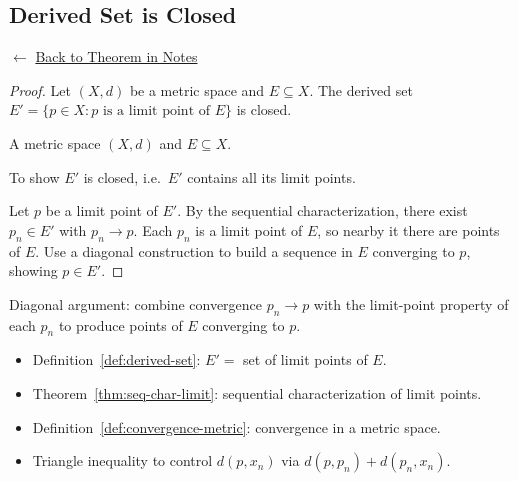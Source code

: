 
\subsection*{Derived Set is Closed}
\label{prf:derived-closed}

\begin{remark*}[Return]
$\leftarrow$ \hyperref[thm:derived-closed]{Back to Theorem in Notes}
\end{remark*}

\begin{proof}
\Claim Let $(X,d)$ be a metric space and $E \subseteq X$.
The derived set $E' = \{p \in X : p \text{ is a limit point of } E\}$
is closed.

\Given A metric space $(X,d)$ and $E \subseteq X$.

\Goal To show $E'$ is closed, i.e.\ $E'$ contains all its limit points.

\Strategy Let $p$ be a limit point of $E'$.
By the sequential characterization, there exist $p_n \in E'$ with $p_n \to p$.
Each $p_n$ is a limit point of $E$, so nearby it there are points of $E$.
Use a diagonal construction to build a sequence in $E$ converging to $p$,
showing $p \in E'$.


\end{proof}

\begin{remark*}
Diagonal argument: combine convergence $p_n \to p$ with the limit-point
property of each $p_n$ to produce points of $E$ converging to $p$.
\end{remark*}

\begin{remark*}[Dependencies]
\begin{itemize}
  \item Definition~\ref{def:derived-set}: $E' = $ set of limit points of $E$.
  \item Theorem~\ref{thm:seq-char-limit}: sequential characterization of limit points.
  \item Definition~\ref{def:convergence-metric}: convergence in a metric space.
  \item Triangle inequality to control $d(p, x_n)$ via $d(p, p_n) + d(p_n, x_n)$.
\end{itemize}
\end{remark*}
